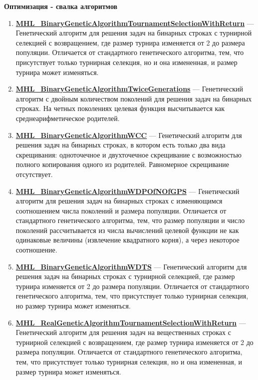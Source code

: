 \documentclass[a4paper,12pt]{article}
\begin{document}
\textbf{Оптимизация - свалка алгоритмов}
\begin{enumerate}

\item \textbf{\hyperref[MHL_BinaryGeneticAlgorithmTournamentSelectionWithReturn]{MHL\_BinaryGeneticAlgorithmTournamentSelectionWithReturn}} --- Генетический алгоритм для решения задач на бинарных строках с турнирной селекцией с возвращением, где размер турнира изменяется от 2 до размера популяции.
Отличается от стандартного генетического алгоритма, тем, что присутствует только турнирная селекция, но и она измененная, и размер турнира может изменяться.

\item \textbf{\hyperref[MHL_BinaryGeneticAlgorithmTwiceGenerations]{MHL\_BinaryGeneticAlgorithmTwiceGenerations}} --- Генетический алгоритм с двойным количеством поколений для решения задач на бинарных строках. На четных поколениях целевая функция высчитывается как среднеарифметическое родителей.

\item \textbf{\hyperref[MHL_BinaryGeneticAlgorithmWCC]{MHL\_BinaryGeneticAlgorithmWCC}} --- Генетический алгоритм для решения задач на бинарных строках, в котором есть только два вида скрещивания: одноточечное и двухточечное скрещивание с возможностью полного копирования одного из родителей. Равномерное скрещивание отсутствует.

\item \textbf{\hyperref[MHL_BinaryGeneticAlgorithmWDPOfNOfGPS]{MHL\_BinaryGeneticAlgorithmWDPOfNOfGPS}} --- Генетический алгоритм для решения задач на бинарных строках с изменяющимся соотношением числа поколений и размера популяции. Отличается от стандартного генетического алгоритма, тем, что размер популяции и число поколений рассчитывается из числа вычислений целевой функции не как одинаковые величины (извлечение квадратного корня), а через некоторое соотношение.

\item \textbf{\hyperref[MHL_BinaryGeneticAlgorithmWDTS]{MHL\_BinaryGeneticAlgorithmWDTS}} --- Генетический алгоритм для решения задач на бинарных строках с турнирной селекцией, где размер турнира изменяется от 2 до размера популяции. Отличается от стандартного генетического алгоритма, тем, что присутствует только турнирная селекция, но размер турнира может изменяться.

\item \textbf{\hyperref[MHL_RealGeneticAlgorithmTournamentSelectionWithReturn]{MHL\_RealGeneticAlgorithmTournamentSelectionWithReturn}} --- Генетический алгоритм для решения задач на вещественных строках  с турнирной селекцией с возвращением, где размер турнира изменяется от 2 до размера популяции.
Отличается от стандартного генетического алгоритма, тем, что присутствует только турнирная селекция, но и она измененная, и размер турнира может изменяться.


\end{enumerate}
\end{document}
